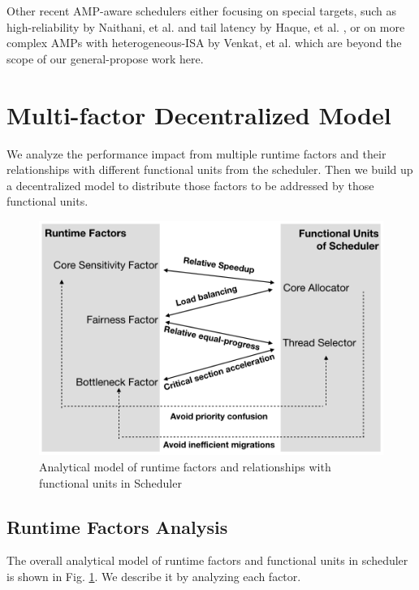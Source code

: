 \documentclass[sigplan,review,anonymous]{acmart}\settopmatter{printfolios=true,printccs=false,printacmref=false}
\begin{document}
Other recent AMP-aware schedulers either focusing on special targets, such as high-reliability by Naithani, et al. \cite{naithani2017reliability} and tail latency by Haque, et al. \cite{haque2017exploiting}, or on more complex AMPs with heterogeneous-ISA by Venkat, et al. \cite{venkat2014harnessing} which are beyond the scope of our general-propose work here. 

\section{Multi-factor Decentralized Model}
We analyze the performance impact from multiple runtime factors and their relationships with different functional units from the scheduler. Then we build up a decentralized model to distribute those factors to be addressed by those functional units. 

\begin{figure}
\centering
\includegraphics[scale=0.4]{figures/mfa.png}
\caption{Analytical model of runtime factors and relationships with functional units in Scheduler}
\label{figure:f1}
\end{figure} 

\subsection{Runtime Factors Analysis}
The overall analytical model of runtime factors and functional units in scheduler is shown in Fig. \ref{figure:f1}. We describe it by analyzing each factor. 
\end{document}

